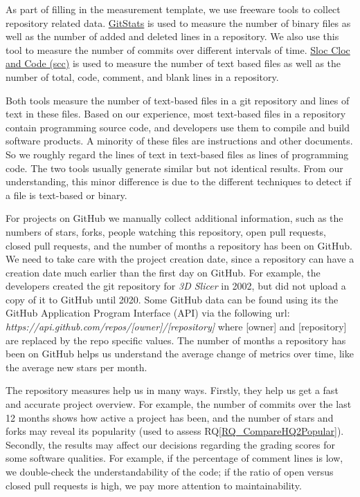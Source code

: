 \documentclass[final, 3p, times, authoryear]{elsarticle}
\newcommand{\rqref}[1]{RQ\ref{#1}}
\begin{document}
As part of filling in the measurement template, we use freeware tools to collect
repository related data. \href{https://github.com/tomgi/git_stats}{GitStats}
\citep{Gieniusz2019} is used to measure the number of binary files as well as
the number of added and deleted lines in a repository. We also use this tool to
measure the number of commits over different intervals of time.
\href{https://github.com/boyter/scc}{Sloc Cloc and Code (scc)}
\citep{Boyter2021} is used to measure the number of text based files as well as
the number of total, code, comment, and blank lines in a repository.

Both tools measure the number of text-based files in a git repository and lines
of text in these files. Based on our experience, most text-based files in a
repository contain programming source code, and developers use them to compile
and build software products. A minority of these files are instructions and
other documents. So we roughly regard the lines of text in text-based files as
lines of programming code. The two tools usually generate similar but not
identical results. From our understanding, this minor difference is due to the
different techniques to detect if a file is text-based or binary.

For projects on GitHub we manually collect additional information, such as the
numbers of stars, forks, people watching this repository, open pull requests,
closed pull requests, and the number of months a repository has been on GitHub.
We need to take care with the project creation date, since a repository can have
a creation date much earlier than the first day on GitHub.  For example, the
developers created the git repository for \textit{3D Slicer} in 2002, but did
not upload a copy of it to GitHub until 2020. Some GitHub data can be found
using its the GitHub Application Program Interface (API) via the following url:
\textit{https://api.github.com/repos/[owner]/[repository]} where [owner] and
[repository] are replaced by the repo specific values. The number of months a
repository has been on GitHub helps us understand the average change of metrics
over time, like the average new stars per month. 

The repository measures help us in many ways. Firstly, they help us get a fast
and accurate project overview. For example, the number of commits over the last
12 months shows how active a project has been, and the number of stars and forks
may reveal its popularity (used to assess \rqref{RQ_CompareHQ2Popular}).
Secondly, the results may affect our decisions regarding the grading scores for
some software qualities. For example, if the percentage of comment lines is low,
we double-check the understandability of the code; if the ratio of open versus
closed pull requests is high, we pay more attention to maintainability.
\end{document}
